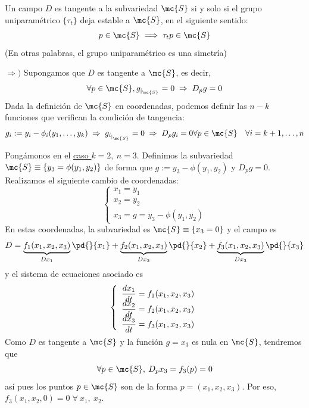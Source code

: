     \begin{prop}
        Un campo $D$ es tangente a la subvariedad $\mc{S}$ si y solo si el grupo uniparamétrico $\{\tau_t\}$ deja estable a $\mc{S}$, en el siguiente sentido:
        $$p \in \mc{S} \; \Longrightarrow \; \tau_tp\in \mc{S}$$
        (En otras palabras, el grupo uniparamétrico es una simetría)
    \end{prop}
    \begin{dem}
        $\Rightarrow)$ Supongamos que $D$ es tangente a $\mc{S}$, es decir, 
        $$\forall p \in \mc{S}, g_{|_{\mc{S}}}=0 \; \Rightarrow \; D_pg=0$$
        Dada la definición de $\mc{S}$ en coordenadas, podemos definir las $n-k$ funciones que verifican la condición de tangencia:
        $$g_i:= y_{i}-\phi_i(y_1, \ldots, y_k) \; \Rightarrow \; g_{i_{|_{\mc{S}}}}=0 \; \Rightarrow \; D_pg_i=0 \forall p \in \mc{S} \quad \forall i=k+1,\ldots, n$$
        
        Pongámonos en el \underline{caso $k=2, \: n=3$}. Definimos la subvariedad $\mc{S}\equiv \{y_3=\phi(y_1,y_2)\}$ de forma que $g:=y_3-\phi(y_1,y_2)$ y $D_pg=0$. Realizamos el siguiente cambio de coordenadas:
        $$\left\{ \begin{array}{l}
         x_1=y_1  \\
          x_2=y_2 \\
          x_3=g=y_3-\phi(y_1,y_2)
    \end{array} \right.$$
    En estas coordenadas, la subvariedad es $\mc{S}\equiv\{x_3=0\}$ y el campo es 
    $$D=\underbrace{f_1(x_1,x_2,x_3)}_{Dx_1}\pd{}{x_1}+\underbrace{f_2(x_1,x_2,x_3)}_{Dx_2}\pd{}{x_2} + \underbrace{f_3(x_1,x_2,x_3)}_{Dx_3}\pd{}{x_3}$$
    y el sistema de ecuaciones asociado es 
    $$\left\{ \begin{array}{l}
         \dfrac{dx_1}{dt}=f_1(x_1,x_2,x_3) \\
         \vspace{-5mm} \\
         \dfrac{dx_2}{dt}=f_2(x_1,x_2,x_3) \\
         \vspace{-5mm} \\
         \dfrac{dx_3}{dt}=f_3(x_1,x_2,x_3) \\
         \vspace{-5mm} \\
    \end{array} \right.$$
    Como $D$ es tangente a $\mc{S}$ y la función $g=x_3$ es nula en $\mc{S}$, tendremos que 
    $$\forall p \in \mc{S}, \: D_px_3=f_3(p)=0$$
    así pues los puntos $p \in \mc{S}$ son de la forma $p=(x_1,x_2,x_3)$. Por eso, $\boxed{f_3(x_1,x_2,0)=0 \;} \forall \: x_1, \: x_2$. 


\end{dem}
